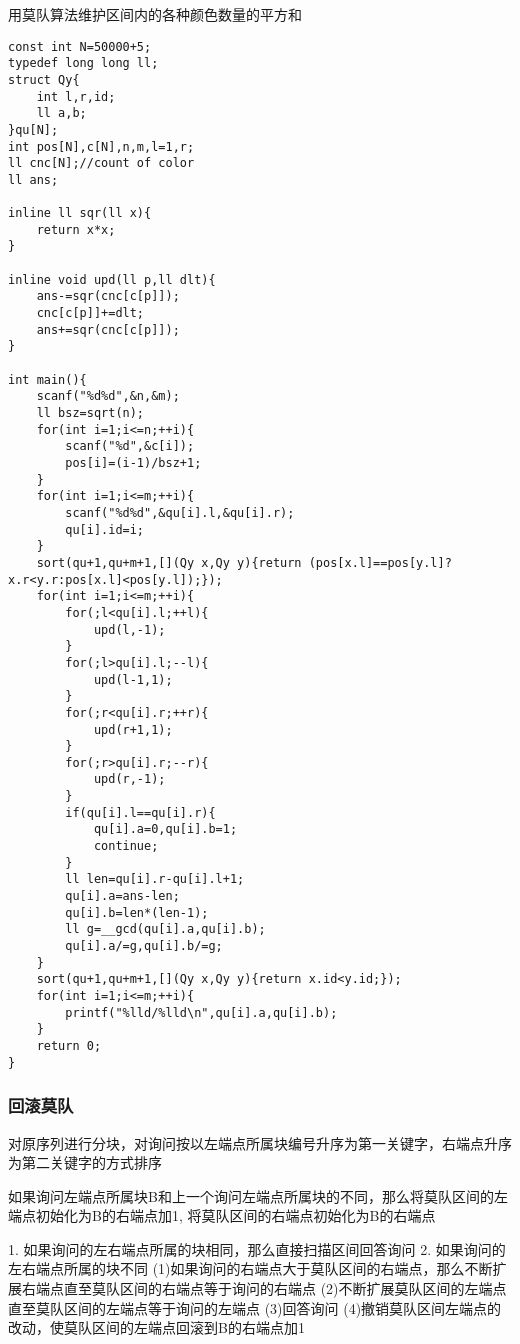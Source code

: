 \documentclass[UTF8]{ctexart}
\begin{document}
用莫队算法维护区间内的各种颜色数量的平方和
\begin{lstlisting}
const int N=50000+5;
typedef long long ll;
struct Qy{
    int l,r,id;
    ll a,b;
}qu[N];
int pos[N],c[N],n,m,l=1,r;
ll cnc[N];//count of color
ll ans;

inline ll sqr(ll x){
    return x*x;
}

inline void upd(ll p,ll dlt){
    ans-=sqr(cnc[c[p]]);
    cnc[c[p]]+=dlt;
    ans+=sqr(cnc[c[p]]);
}

int main(){
    scanf("%d%d",&n,&m);
    ll bsz=sqrt(n);
    for(int i=1;i<=n;++i){
        scanf("%d",&c[i]);
        pos[i]=(i-1)/bsz+1;
    }
    for(int i=1;i<=m;++i){
        scanf("%d%d",&qu[i].l,&qu[i].r);
        qu[i].id=i;
    }
    sort(qu+1,qu+m+1,[](Qy x,Qy y){return (pos[x.l]==pos[y.l]?x.r<y.r:pos[x.l]<pos[y.l]);});
    for(int i=1;i<=m;++i){
        for(;l<qu[i].l;++l){
            upd(l,-1);
        }
        for(;l>qu[i].l;--l){
            upd(l-1,1);
        }
        for(;r<qu[i].r;++r){
            upd(r+1,1);
        }
        for(;r>qu[i].r;--r){
            upd(r,-1);
        }
        if(qu[i].l==qu[i].r){
            qu[i].a=0,qu[i].b=1;
            continue;
        }
        ll len=qu[i].r-qu[i].l+1;
        qu[i].a=ans-len;
        qu[i].b=len*(len-1);
        ll g=__gcd(qu[i].a,qu[i].b);
        qu[i].a/=g,qu[i].b/=g;
    }
    sort(qu+1,qu+m+1,[](Qy x,Qy y){return x.id<y.id;});
    for(int i=1;i<=m;++i){
        printf("%lld/%lld\n",qu[i].a,qu[i].b);
    }
    return 0;
} 
\end{lstlisting}
\subsubsection{回滚莫队}
对原序列进行分块，对询问按以左端点所属块编号升序为第一关键字，右端点升序为第二关键字的方式排序

如果询问左端点所属块B和上一个询问左端点所属块的不同，那么将莫队区间的左端点初始化为B的右端点加1, 将莫队区间的右端点初始化为B的右端点

1. 如果询问的左右端点所属的块相同，那么直接扫描区间回答询问
2. 如果询问的左右端点所属的块不同
(1)如果询问的右端点大于莫队区间的右端点，那么不断扩展右端点直至莫队区间的右端点等于询问的右端点
(2)不断扩展莫队区间的左端点直至莫队区间的左端点等于询问的左端点
(3)回答询问
(4)撤销莫队区间左端点的改动，使莫队区间的左端点回滚到B的右端点加1
\end{document}
